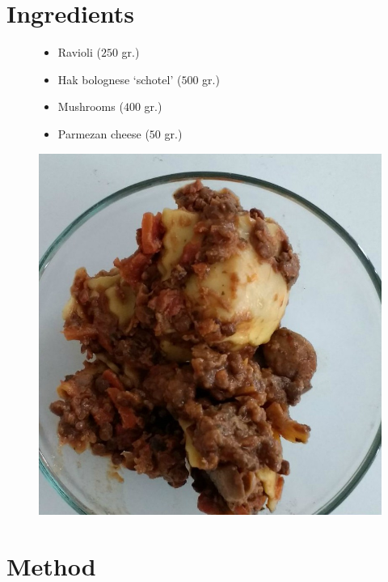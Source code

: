 \documentclass[a4paper,12pt]{report}
\begin{document}
\section*{Ingredients}
\begin{figure}[h]

\begin{minipage}{0.65\textwidth}
\begin{itemize}
\item Ravioli ($250$ gr.)
\item Hak bolognese `schotel' ($500$ gr.)
\item Mushrooms ($400$ gr.)
\item Parmezan cheese ($50$ gr.)
\end{itemize}
\end{minipage}
\begin{minipage}{0.3\textwidth}
	\includegraphics[scale=0.17]{Images/ravioliend.jpg}
\end{minipage}
\end{figure}


\section*{Method}
\end{document}
